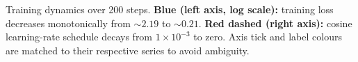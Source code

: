 \caption{Training dynamics over 200 steps. \textbf{Blue (left axis, log scale):} training loss decreases monotonically from ${\sim}2.19$ to ${\sim}0.21$. \textbf{Red dashed (right axis):} cosine learning-rate schedule decays from $1\times10^{-3}$ to zero. Axis tick and label colours are matched to their respective series to avoid ambiguity.}
